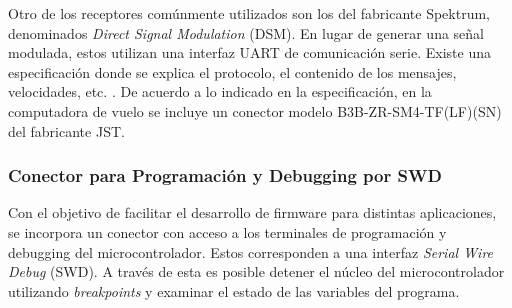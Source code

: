 



Otro de los receptores comúnmente utilizados son los del fabricante Spektrum, denominados \textit{Direct Signal Modulation} (DSM). En lugar de generar una señal modulada, estos utilizan una interfaz UART de comunicación serie. Existe una especificación donde se explica el protocolo, el contenido de los mensajes, velocidades, etc. \cite{Spektrum_spec}. De acuerdo a lo indicado en la especificación, en la computadora de vuelo se incluye un conector modelo B3B-ZR-SM4-TF(LF)(SN) del fabricante JST. 



\subsubsection{Conector para Programación y Debugging por SWD}

Con el objetivo de facilitar el desarrollo de firmware para distintas aplicaciones, se incorpora un conector con acceso a los terminales de programación y debugging del microcontrolador. Estos corresponden a una interfaz \textit{Serial Wire Debug} (SWD). A través de esta es posible detener el núcleo del microcontrolador utilizando \textit{breakpoints} y examinar el estado de las variables del programa.


